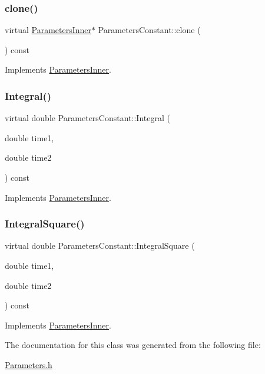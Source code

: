 \subsubsection{\texorpdfstring{clone()}{clone()}}
{\footnotesize\ttfamily virtual \hyperlink{classParametersInner}{Parameters\+Inner}$\ast$ Parameters\+Constant\+::clone (\begin{DoxyParamCaption}{ }\end{DoxyParamCaption}) const\hspace{0.3cm}{\ttfamily [virtual]}}



Implements \hyperlink{classParametersInner_a421a238e889bfe41cc7db9d7e918d4b0}{Parameters\+Inner}.

\hypertarget{classParametersConstant_afeb3f63d392314a243a0156599ee3a42}{}\label{classParametersConstant_afeb3f63d392314a243a0156599ee3a42} 
\subsubsection{\texorpdfstring{Integral()}{Integral()}}
{\footnotesize\ttfamily virtual double Parameters\+Constant\+::\+Integral (\begin{DoxyParamCaption}\item[{double}]{time1,  }\item[{double}]{time2 }\end{DoxyParamCaption}) const\hspace{0.3cm}{\ttfamily [virtual]}}



Implements \hyperlink{classParametersInner_ade3035097353fd2f38d3a20bf737d46a}{Parameters\+Inner}.

\hypertarget{classParametersConstant_ad5c8d91b72338d7fca8efc71b956d32f}{}\label{classParametersConstant_ad5c8d91b72338d7fca8efc71b956d32f} 
\subsubsection{\texorpdfstring{Integral\+Square()}{IntegralSquare()}}
{\footnotesize\ttfamily virtual double Parameters\+Constant\+::\+Integral\+Square (\begin{DoxyParamCaption}\item[{double}]{time1,  }\item[{double}]{time2 }\end{DoxyParamCaption}) const\hspace{0.3cm}{\ttfamily [virtual]}}



Implements \hyperlink{classParametersInner_a12e3be9c5daf0d6dc74a460905f1b46e}{Parameters\+Inner}.



The documentation for this class was generated from the following file\+:\begin{DoxyCompactItemize}
\item 
\hyperlink{Parameters_8h}{Parameters.\+h}\end{DoxyCompactItemize}

